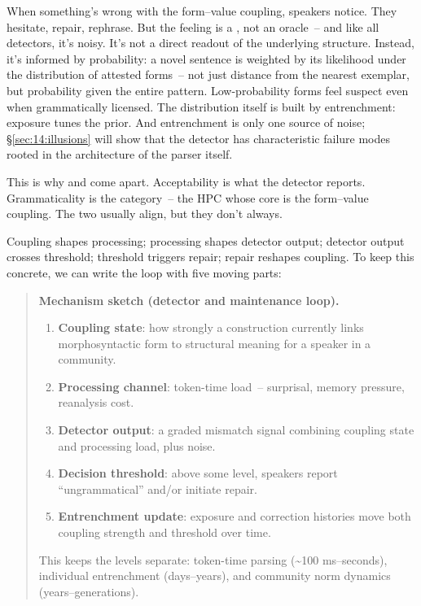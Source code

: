 When something's wrong with the form--value coupling, speakers notice. They hesitate, repair, rephrase. But the feeling is a , not an oracle~-- and like all detectors, it's noisy. It's not a direct readout of the underlying structure. Instead, it's informed by probability: a novel sentence is weighted by its likelihood under the distribution of attested forms~-- not just distance from the nearest exemplar, but probability given the entire pattern. Low-probability forms feel suspect even when grammatically licensed. The distribution itself is built by entrenchment: exposure tunes the prior. And entrenchment is only one source of noise; §\ref{sec:14:illusions} will show that the detector has characteristic failure modes rooted in the architecture of the parser itself.

This is why  and  come apart. Acceptability is what the detector reports. Grammaticality is the category~-- the HPC whose core is the form--value coupling. The two usually align, but they don't always.

Coupling shapes processing; processing shapes detector output; detector output crosses threshold; threshold triggers repair; repair reshapes coupling. To keep this concrete, we can write the loop with five moving parts:
\begin{quote}
\textbf{Mechanism sketch (detector and maintenance loop).}
\begin{enumerate}
    \item \textbf{Coupling state}: how strongly a construction currently links morphosyntactic form to structural meaning for a speaker in a community.
    \item \textbf{Processing channel}: token-time load~-- surprisal, memory pressure, reanalysis cost.
    \item \textbf{Detector output}: a graded mismatch signal combining coupling state and processing load, plus noise.
    \item \textbf{Decision threshold}: above some level, speakers report \enquote{ungrammatical} and/or initiate repair.
    \item \textbf{Entrenchment update}: exposure and correction histories move both coupling strength and threshold over time.
\end{enumerate}
This keeps the levels separate: token-time parsing (\textasciitilde100 ms--seconds), individual entrenchment (days--years), and community norm dynamics (years--generations).
\end{quote}


